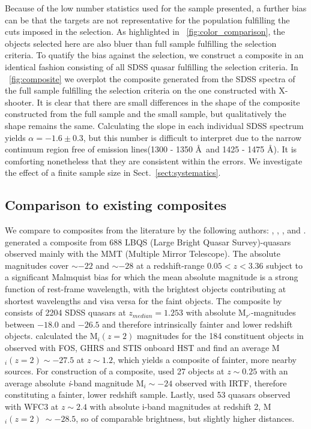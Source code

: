 \documentclass{aa}    %
\newcommand{\figref}[1]{\ref{fig:#1}}
\newcommand{\Fig}[1]{\figurename~\figref{#1}}
\newcommand{\fig}[1]{\Fig{#1}}
\newcommand{\sectionname}{Sect.}
\newcommand{\Sect}[1]{\sectionname~\ref{sect:#1}}
\newcommand{\sect}[1]{\Sect{#1}}
\newcommand{\sectlabel}[1]{\label{sect:#1}}
\begin{document}
Because of the low number statistics used for the sample presented, a further bias can be that the targets are not representative for the population fulfilling the cuts imposed in the selection. As highlighted in \fig{color_comparison}, the objects selected here are also bluer than full sample fulfilling the selection criteria. To quatify the bias against the selection, we construct a composite in an identical fashion consisting of all SDSS quasar fulfilling the selection criteria. 
In \fig{composite} we overplot the composite generated from the SDSS spectra of the full sample fulfilling the selection criteria on the one constructed with X-shooter. It is clear that there are small differences in the shape of the composite constructed from the full sample and the small sample, but qualitatively the shape remains the same. Calculating the slope in each individual SDSS spectrum yields $\alpha = -1.6\pm 0.3$, but this number is difficult to interpret due to the narrow continuum region free of emission lines(1300 - 1350 \AA~and 1425 - 1475 \AA). It is comforting nonetheless that they are consistent within the errors. We investigate the effect of a finite sample size in \sect{systematics}.


\subsection{Comparison to existing composites} \sectlabel{comparison}

We compare to composites from the literature by the following authors: \citet{Francis1991}, \citet{VandenBerk2001}, \citet{Telfer2002}, \citet{Glikman2006} and \citet{Lusso2015}. \citet{Francis1991} generated a composite from 688 LBQS (Large Bright Quasar Survey)-quasars observed mainly with the MMT (Multiple Mirror Telescope). The absolute magnitudes cover $\sim -22$ and $\sim -28$ at a redshift-range $0.05 < z  < 3.36$ subject to a significant Malmquist bias for which the mean absolute magnitude is a strong function of rest-frame wavelength, with the brightest objects contributing at shortest wavelengths and visa versa for the faint objects. The composite by \citet{VandenBerk2001} consists of 2204 SDSS quasars at $z_{median} = 1.253$ with absolute M$_{r'}$-magnitudes between $-18.0$ and $-26.5$ and therefore intrinsically fainter and lower redshift objects. \citet{Lusso2015} calculated the M$_i(z=2)$ magnitudes for the 184 constituent objects in \citet{Telfer2002} observed with FOS, GHRS and STIS onboard HST and find an average M$_i(z=2) \sim -27.5$ at $z \sim 1.2$, which yields a composite of fainter, more nearby sources. For construction of a composite, \citet{Glikman2006}  used 27 objects at $z \sim 0.25$ with an average absolute \textit{i}-band magnitude M$_i \sim -24$ observed with IRTF, therefore constituting a fainter, lower redshift sample. Lastly, \citet{Lusso2015} used 53 quasars observed with WFC3 at $z \sim 2.4$ with absolute i-band magnitudes at redshift 2, M$_i(z=2) ~\sim -28.5$, so of comparable brightness, but slightly higher distances.
\end{document}
